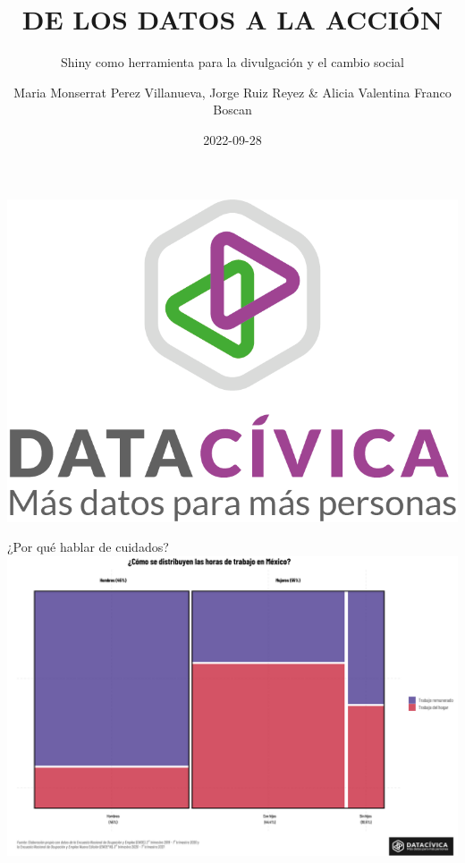 \documentclass[
  ignorenonframetext,
]{beamer}
\title{DE LOS DATOS A LA ACCIÓN}
\subtitle{Shiny como herramienta para la divulgación y el cambio social}
\author{Maria Monserrat Perez Villanueva, Jorge Ruiz Reyez \& Alicia
Valentina Franco Boscan}
\date{2022-09-28}
\begin{document}
\frame{\titlepage}

\begin{frame}{}
\protect\hypertarget{section}{}
\includegraphics[width=10.62in]{img/DC_logo_2017-01}
\end{frame}

\begin{frame}{¿Por qué hablar de cuidados?}
\protect\hypertarget{por-quuxe9-hablar-de-cuidados}{}
\includegraphics[width=62.5in]{img/distri}
\end{frame}
\end{document}
